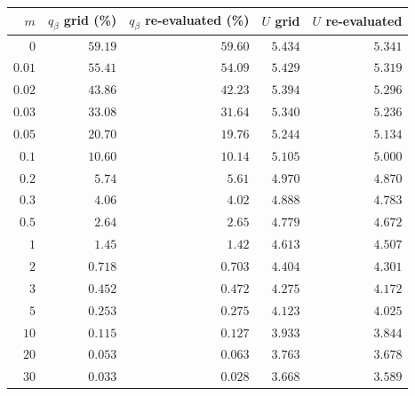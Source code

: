 \setlength{\tabcolsep}{2.5pt}\begin{tabular}{rrrrr}
\toprule
$m$ & $q_\beta$ grid (\%) & $q_\beta$ re-evaluated (\%) & $U$ grid & $U$ re-evaluated \\
\midrule
$0$ & $59.19$ & $59.60$ & $5.434$ & $5.341$ \\
$0.01$ & $55.41$ & $54.09$ & $5.429$ & $5.319$ \\
$0.02$ & $43.86$ & $42.23$ & $5.394$ & $5.296$ \\
$0.03$ & $33.08$ & $31.64$ & $5.340$ & $5.236$ \\
$0.05$ & $20.70$ & $19.76$ & $5.244$ & $5.134$ \\
$0.1$ & $10.60$ & $10.14$ & $5.105$ & $5.000$ \\
$0.2$ & $5.74$ & $5.61$ & $4.970$ & $4.870$ \\
$0.3$ & $4.06$ & $4.02$ & $4.888$ & $4.783$ \\
$0.5$ & $2.64$ & $2.65$ & $4.779$ & $4.672$ \\
$1$ & $1.45$ & $1.42$ & $4.613$ & $4.507$ \\
$2$ & $0.718$ & $0.703$ & $4.404$ & $4.301$ \\
$3$ & $0.452$ & $0.472$ & $4.275$ & $4.172$ \\
$5$ & $0.253$ & $0.275$ & $4.123$ & $4.025$ \\
$10$ & $0.115$ & $0.127$ & $3.933$ & $3.844$ \\
$20$ & $0.053$ & $0.063$ & $3.763$ & $3.678$ \\
$30$ & $0.033$ & $0.028$ & $3.668$ & $3.589$ \\
\bottomrule
\end{tabular}
